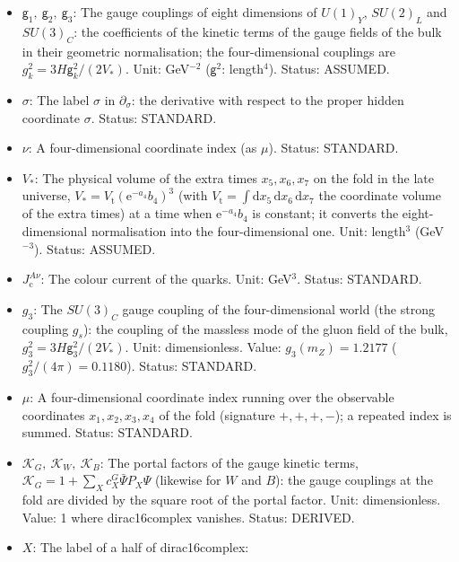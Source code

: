 \documentclass[
  10pt,
]{article}
\begin{document}
\begin{itemize}
  \(x_0\) is the whole line \(-\infty < \sigma < \infty\). Unit: length.
  Status: DERIVED.
\item
  \(\mathsf{g}_1,\ \mathsf{g}_2,\ \mathsf{g}_3\): The gauge couplings of
  eight dimensions of \(U(1)_Y\), \(SU(2)_L\) and \(SU(3)_C\): the
  coefficients of the kinetic terms of the gauge fields of the bulk in
  their geometric normalisation; the four-dimensional couplings are
  \(g_k^2 = 3H\mathsf{g}_k^2/(2V_*)\). Unit: GeV\(^{-2}\)
  (\(\mathsf{g}^2\): length\(^4\)). Status: ASSUMED.
\item
  \(\sigma\): The label \(\sigma\) in \(\partial_\sigma\): the
  derivative with respect to the proper hidden coordinate \(\sigma\).
  Status: STANDARD.
\item
  \(\nu\): A four-dimensional coordinate index (as \(\mu\)). Status:
  STANDARD.
\item
  \(V_*\): The physical volume of the extra times \(x_5, x_6, x_7\) on
  the fold in the late universe,
  \(V_* = V_{\mathrm{t}}(\mathrm{e}^{-a_4}b_4)^3\) (with
  \(V_{\mathrm{t}} = \int\mathrm{d}x_5\,\mathrm{d}x_6\,\mathrm{d}x_7\)
  the coordinate volume of the extra times) at a time when
  \(\mathrm{e}^{-a_4}b_4\) is constant; it converts the
  eight-dimensional normalisation into the four-dimensional one. Unit:
  length\(^3\) (GeV\(^{-3}\)). Status: ASSUMED.
\item
  \(J_{\mathrm{c}}^{A\nu}\): The colour current of the quarks. Unit:
  GeV\(^3\). Status: STANDARD.
\item
  \(g_3\): The \(SU(3)_C\) gauge coupling of the four-dimensional world
  (the strong coupling \(g_s\)): the coupling of the massless mode of
  the gluon field of the bulk, \(g_3^2 = 3H\mathsf{g}_3^2/(2V_*)\).
  Unit: dimensionless. Value: \(g_3(m_Z) = 1.2177\)
  (\(g_3^2/(4\pi) = 0.1180\)). Status: STANDARD.
\item
  \(\mu\): A four-dimensional coordinate index running over the
  observable coordinates \(x_1, x_2, x_3, x_4\) of the fold (signature
  \(+,+,+,-\)); a repeated index is summed. Status: STANDARD.
\item
  \(\mathcal{K}_{G},\ \mathcal{K}_{W},\ \mathcal{K}_{B}\): The portal
  factors of the gauge kinetic terms,
  \(\mathcal{K}_{G} = 1 + \sum_Xc^{G}_X\bar\Psi P_X\Psi\) (likewise for
  \(W\) and \(B\)): the gauge couplings at the fold are divided by the
  square root of the portal factor. Unit: dimensionless. Value: 1 where
  dirac16complex vanishes. Status: DERIVED.
\item
  \(X\): The label of a half of dirac16complex:

\end{itemize}
\end{document}
